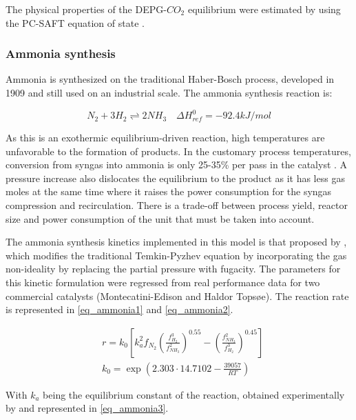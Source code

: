 \documentclass[a4paper, titlepage]{article}
\begin{document}
The physical properties of the DEPG-$CO_2$ equilibrium were estimated by using the PC-SAFT equation of state
\cite{dymentAcidGasCleaning2015}.

\subsubsection{Ammonia synthesis}

Ammonia is synthesized on the traditional Haber-Bosch process, developed in 1909 and still used on an industrial scale.
The ammonia synthesis reaction is:

\begin{equation}
    N_2 + 3H_2 \rightleftharpoons 2NH_3 \quad \Delta H_{ref}^0 = -92.4 kJ/mol
\end{equation}

As this is an exothermic equilibrium-driven reaction, high temperatures are unfavorable to the formation of products.
In the customary process temperatures, conversion from syngas into ammonia is only 25-35\% per pass in the catalyst
\cite{applAmmoniaPrinciplesIndustrial1999}. A pressure increase also dislocates the equilibrium to the product as it
has less gas moles \cite{sandlerChemicalBiochemicalEngineering2017} at the same time where it raises the power
consumption for the syngas compression and recirculation. There is a trade-off between process yield, reactor size and
power consumption of the unit that must be taken into account.

The ammonia synthesis kinetics implemented in this model is that proposed by
\textcite{singhSimulationAmmoniaSynthesis1979}, which modifies the traditional Temkin-Pyzhev equation
\cite{temkinKineticsAmmoniaSynthesis1940} by incorporating the gas non-ideality by replacing the partial pressure
with fugacity. The parameters for this kinetic formulation were regressed from real performance data for two
commercial catalysts (Montecatini-Edison and Haldor Topsøe). The reaction rate is represented in \autoref{eq_ammonia1}
and \autoref{eq_ammonia2}.

\begin{align}
     & r = k_0 \left[ k_a^2f_{N_2} \left(  \frac{f^3_{H_2}}{f^2_{NH_3}} \right)^{0.55} - \left(
    \frac{f^2_{NH_3}}{f^3_{H_2}} \right)^{0.45} \right] \label{eq_ammonia1}                     \\
     & k_0 = \exp \left(2.303 \cdot 14.7102 - \frac{39057}{RT}\right) \label{eq_ammonia2}
\end{align}

With $k_a$ being the equilibrium constant of the reaction, obtained experimentally by
\textcite{gillespieThermodynamicTreatmentChemical1930} and represented in \autoref{eq_ammonia3}.
\end{document}
